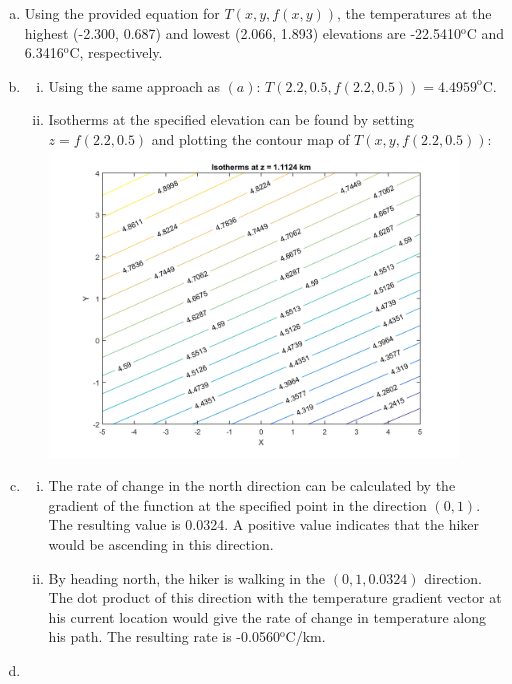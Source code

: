 \documentclass[12pt,onecolumn]{article}
\begin{document}
\begin{enumerate}[a.]
\item Using the provided equation for $T(x,y,f(x,y))$, the temperatures at the highest (-2.300, 0.687) and lowest (2.066, 1.893) elevations are -22.5410$^{\text{o}}$C and 6.3416$^{\text{o}}$C, respectively.

\item
\begin{enumerate}[i.]
\item Using the same approach as $(a)$: $T(2.2,0.5,f(2.2,0.5)) = 4.4959 ^{\text{o}}$C.
\item Isotherms at the specified elevation can be found by setting $z = f(2.2, 0.5)$ and plotting the contour map of $T(x,y,f(2.2,0.5))$:\\
	\includegraphics[width=0.9\textwidth]{Isotherms}
\end{enumerate}
\item 
\begin{enumerate}[i.]
\item The rate of change in the north direction can be calculated by the gradient of the function at the specified point in the direction $(0,1)$. The resulting value is 0.0324. A positive value indicates that the hiker would be ascending in this direction.
\item By heading north, the hiker is walking in the $(0, 1, 0.0324)$ direction. The dot product of this direction with the temperature gradient vector at his current location would give the rate of change in temperature along his path. The resulting rate is -0.0560$^{\text{o}}$C/km.
\end{enumerate}
\item 
\begin{enumerate}[i.]

\end{enumerate}
\end{enumerate}
\end{document}
